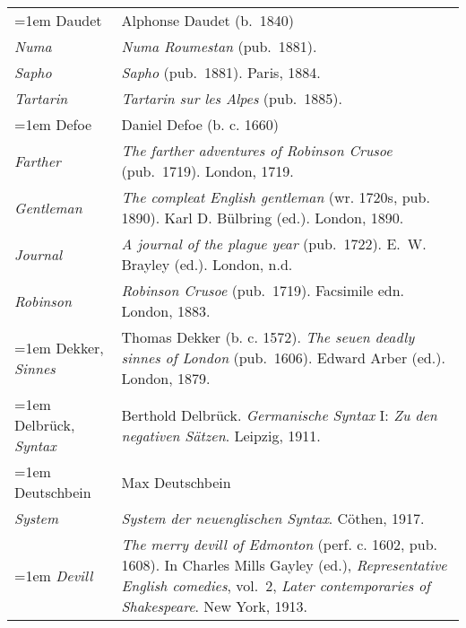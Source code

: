 \begin{xltabular}{\textwidth}{ lQ }
\hangindent=1em  Daudet & Alphonse Daudet (b.~1840) \\
\hspace{1em}\textit{Numa} & \textit{Numa Roumestan} (pub.~1881). \\
\hspace{1em}\textit{Sapho} & \textit{Sapho} (pub.~1881). Paris, 1884. \\
\hspace{1em}\textit{Tartarin} & \textit{Tartarin sur les Alpes} (pub.~1885). \\

\hangindent=1em  Defoe & Daniel Defoe (b. c. 1660) \\
\hspace{1em}\textit{Farther} & \textit{The farther adventures of Robinson Crusoe} (pub.~1719). London, 1719. \\
\hspace{1em}\textit{Gentleman} & \textit{The compleat English gentleman} (wr. 1720s, pub. 1890). Karl D. Bülbring (ed.). London, 1890. \\ 
\hspace{1em}\textit{Journal} & \textit{A journal of the plague year} (pub.~1722). E.~W. Brayley (ed.). London, n.d. \\
\hspace{1em}\textit{Robinson} & \textit{Robinson Crusoe} (pub.~1719). Facsimile edn. London, 1883. \\

\hangindent=1em  Dekker, \textit{Sinnes} & Thomas Dekker (b. c. 1572). \textit{The seuen deadly sinnes of London} (pub.~1606). Edward Arber (ed.). London, 1879. \\ %

\hangindent=1em  Delbrück, \textit{Syntax} & Berthold Delbrück. \textit{Germanische Syntax} I: \textit{Zu den negativen Sätzen}. Leipzig, 1911. \\

\hangindent=1em  Deutschbein & Max Deutschbein\\
\hspace{1em}\textit{System} &  \textit{System der neuenglischen Syntax}. Cöthen, 1917. \\

\hangindent=1em  \textit{Devill} & \textit{The merry devill of Edmonton} (perf. c. 1602, pub. 1608). In Charles Mills Gayley (ed.), \textit{Representative English comedies}, vol.~2, \textit{Later contemporaries of Shakespeare}. New York, 1913. \\ %


\end{xltabular}
